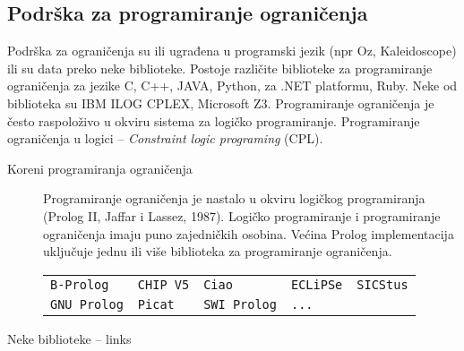 \documentclass[../main.tex]{subfiles}
\begin{document}
\subsection{Podrška za programiranje ograničenja}									%

Podrška za ograničenja su ili ugrađena u programski jezik (npr Oz, Kaleidoscope) ili su data preko neke biblioteke. Postoje različite biblioteke za programiranje ograničenja za jezike C, C++, JAVA, Python, za .NET platformu, Ruby. Neke od biblioteka su IBM ILOG CPLEX, Microsoft Z3. Programiranje ograničenja je često raspoloživo u okviru sistema za logičko programiranje. Programiranje ograničenja u logici -- {\it Constraint logic programing} (CPL).

\begin{description}
	\item[Koreni programiranja ograničenja] \hfill

	Programiranje ograničenja je nastalo u okviru logičkog programiranja (Prolog II, Jaffar i Lassez, 1987). Logičko programiranje i programiranje ograničenja imaju puno zajedničkih osobina. Većina Prolog implementacija uključuje jednu ili više biblioteka za programiranje ograničenja.\\
	\begin{tabularx}{\textwidth}{XXXXX}
	\texttt{B-Prolog} & \texttt{CHIP V5} & \texttt{Ciao} & \texttt{ECLiPSe} & \texttt{SICStus}  \\
	\texttt{GNU Prolog} & \texttt{Picat} & \texttt{SWI Prolog} & \texttt{...} & \\
\end{tabularx}

	\item[Neke biblioteke -- links] \hfill
	

\end{description}
\end{document}
